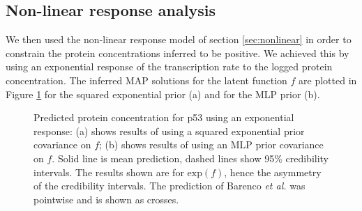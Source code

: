 \documentclass[english]{article}
\begin{document}
\subsection{Non-linear response analysis}
We then used the non-linear response model of section \ref{sec:nonlinear} in 
order to constrain the protein concentrations inferred to be positive. We 
achieved this by using an exponential response of the transcription rate to 
the logged protein concentration. 
The inferred MAP solutions for the latent function $f$ are plotted in Figure
\ref{nonlinearInf} for the squared exponential prior (a) and for the MLP prior
(b).

%
\begin{figure}[ht]\vspace{-0.4cm}
\begin{center}
\end{center}\vspace{-0.4cm}
\caption{\small Predicted protein concentration for p53 using an exponential response:
(a) shows results of using a squared exponential prior covariance on $f$; (b) 
shows results of using an MLP prior covariance on $f$.
Solid line is mean 
prediction, dashed
lines show 95\% credibility intervals. The results shown are for 
$\textrm{exp}(f)$, hence the asymmetry of the credibility intervals. 
The prediction of Barenco \emph{et al.} was pointwise and is shown as crosses.}
\label{nonlinearInf}\vspace{-0.3cm}
\end{figure}%
\end{document}
